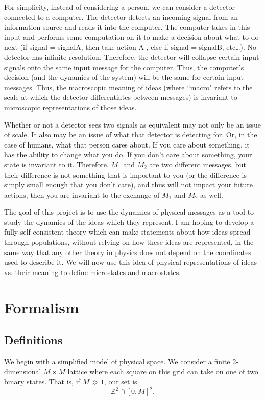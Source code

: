 \documentclass{article}
\begin{document}
For simplicity, instead of considering a person, we can consider a detector connected to a computer. The detector detects an incoming signal from an information source and reads it into the computer. The computer takes in this input and performs some computation on it to make a decision about what to do next (if signal = signalA,  then take action A , else if signal = signalB, etc\dots). No detector has infinite resolution. Therefore, the detector will collapse certain input signals onto the same input message for the computer. Thus, the computer's decision (and the dynamics of the system) will be the same for certain input messages. Thus, the macroscopic meaning of ideas (where ``macro" refers to the scale at which the detector differentiates between messages) is invariant to microscopic representations of those ideas. 

Whether or not a detector sees two signals as equivalent may not only be an issue of scale. It also may be an issue of what that detector is detecting for. Or, in the case of humans, what that person cares about. If you care about something, it has the ability to change what you do. If you don't care about something, your state is invariant to it. Therefore, $M_1$ and $M_2$ are two different messages, but their difference is not something that is important to you (or the difference is simply small enough that you don't care), and thus will not impact your future actions, then you are invariant to the exchange of $M_1$ and $M_2$ as well.

The goal of this project is to use the dynamics of physical messages as a tool to study the dynamics of the ideas which they represent. I am hoping to develop a fully self-consistent theory which can make statements about how ideas spread through populations, without relying on how these ideas are represented, in the same way that any other theory in physics does not depend on the coordinates used to describe it. We will now use this idea of physical representations of ideas vs. their meaning to define microstates and macrostates.

\section{Formalism}

\subsection{Definitions}

We begin with a simplified model of physical space. We consider a finite 2-dimensional $M\times M$ lattice where each square on this grid can take on one of two binary states. That is, if $M\gg 1$, our set is \[ \mathbb{Z}^2\cap[0,M]^2. \]
\end{document}
